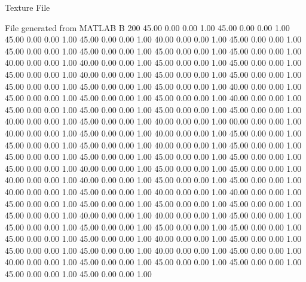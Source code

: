 Texture File

File generated from MATLAB
B 200
   45.00   0.00   0.00   1.00
   45.00   0.00   0.00   1.00
   45.00   0.00   0.00   1.00
   45.00   0.00   0.00   1.00
   40.00   0.00   0.00   1.00
   45.00   0.00   0.00   1.00
   45.00   0.00   0.00   1.00
   45.00   0.00   0.00   1.00
   45.00   0.00   0.00   1.00
   45.00   0.00   0.00   1.00
   40.00   0.00   0.00   1.00
   40.00   0.00   0.00   1.00
   45.00   0.00   0.00   1.00
   45.00   0.00   0.00   1.00
   45.00   0.00   0.00   1.00
   40.00   0.00   0.00   1.00
   45.00   0.00   0.00   1.00
   45.00   0.00   0.00   1.00
   45.00   0.00   0.00   1.00
   45.00   0.00   0.00   1.00
   45.00   0.00   0.00   1.00
   40.00   0.00   0.00   1.00
   45.00   0.00   0.00   1.00
   45.00   0.00   0.00   1.00
   45.00   0.00   0.00   1.00
   40.00   0.00   0.00   1.00
   45.00   0.00   0.00   1.00
   45.00   0.00   0.00   1.00
   45.00   0.00   0.00   1.00
   45.00   0.00   0.00   1.00
   40.00   0.00   0.00   1.00
   45.00   0.00   0.00   1.00
   40.00   0.00   0.00   1.00
   00.00   0.00   0.00   1.00
   40.00   0.00   0.00   1.00
   45.00   0.00   0.00   1.00
   40.00   0.00   0.00   1.00
   45.00   0.00   0.00   1.00
   45.00   0.00   0.00   1.00
   45.00   0.00   0.00   1.00
   40.00   0.00   0.00   1.00
   45.00   0.00   0.00   1.00
   45.00   0.00   0.00   1.00
   45.00   0.00   0.00   1.00
   45.00   0.00   0.00   1.00
   45.00   0.00   0.00   1.00
   45.00   0.00   0.00   1.00
   40.00   0.00   0.00   1.00
   45.00   0.00   0.00   1.00
   45.00   0.00   0.00   1.00
   40.00   0.00   0.00   1.00
   40.00   0.00   0.00   1.00
   45.00   0.00   0.00   1.00
   45.00   0.00   0.00   1.00
   40.00   0.00   0.00   1.00
   45.00   0.00   0.00   1.00
   40.00   0.00   0.00   1.00
   40.00   0.00   0.00   1.00
   45.00   0.00   0.00   1.00
   45.00   0.00   0.00   1.00
   45.00   0.00   0.00   1.00
   45.00   0.00   0.00   1.00
   45.00   0.00   0.00   1.00
   40.00   0.00   0.00   1.00
   40.00   0.00   0.00   1.00
   45.00   0.00   0.00   1.00
   45.00   0.00   0.00   1.00
   45.00   0.00   0.00   1.00
   45.00   0.00   0.00   1.00
   45.00   0.00   0.00   1.00
   45.00   0.00   0.00   1.00
   45.00   0.00   0.00   1.00
   40.00   0.00   0.00   1.00
   45.00   0.00   0.00   1.00
   45.00   0.00   0.00   1.00
   45.00   0.00   0.00   1.00
   40.00   0.00   0.00   1.00
   45.00   0.00   0.00   1.00
   40.00   0.00   0.00   1.00
   45.00   0.00   0.00   1.00
   45.00   0.00   0.00   1.00
   45.00   0.00   0.00   1.00
   45.00   0.00   0.00   1.00
   45.00   0.00   0.00   1.00
